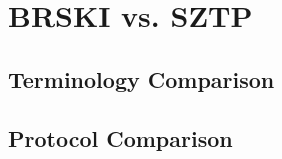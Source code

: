 \chapter{BRSKI vs. SZTP}\label{appendix-A}
\section{Terminology Comparison}

\begin{landscape}
\section{Protocol Comparison}

\end{landscape}
